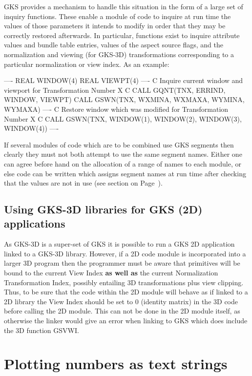 GKS provides a mechanism to handle this situation in the form of a large set
of inquiry functions. These enable a module of code to inquire at run time the
values of those parameters it intends to modify in order that they may
be correctly restored afterwards. In particular, functions exist
to inquire attribute values and bundle table entries, values of the
aspect source flags, and the normalization and viewing (for GKS-3D)
transformations corresponding to a particular normalization or view index.
As an example:
\begin{XMP}
           ----
      REAL WINDOW(4)
      REAL VIEWPT(4)
           ----
C     Inquire current window and viewport for Transformation Number X
C
      CALL GQNT(TNX, ERRIND, WINDOW, VIEWPT)
      CALL GSWN(TNX, WXMINA, WXMAXA, WYMINA, WYMAXA)
           ----
C     Restore window which was modified for Transformation Number X
C
      CALL GSWN(TNX, WINDOW(1), WINDOW(2), WINDOW(3), WINDOW(4))
           ----
\end{XMP}
 
If several modules of code which are to be combined use GKS segments then
clearly they must not both attempt to use the same segment names.
Either one can agree before hand on the allocation of a range of names
to each module, or else code can be written which assigns segment names
at run time after checking that the values are not in use
(see section on Page~\pageref{sec:segnam}).
\subsection{Using GKS-3D libraries for GKS (2D) applications}
 
As GKS-3D is a super-set of GKS it is possible to run a GKS 2D application
linked to a GKS-3D library. However, if a 2D code module is incorporated
into a larger 3D program then the programmer must be aware that primitives
will be bound to the current View Index {\bf as well as} the current
Normalization Transformation Index, possibly entailing 3D transformations
plus view clipping.
Thus, to be sure that the code within the 2D module will behave as if linked
to a 2D library the View Index should be set to 0 (identity matrix) in the
3D code before calling the 2D module.
This can not be done in the 2D module itself, as otherwise the linker would give
an error when linking to GKS which does include the 3D function GSVWI.
\section{\protect\label{sec:refintw}Plotting numbers as text strings}
 
